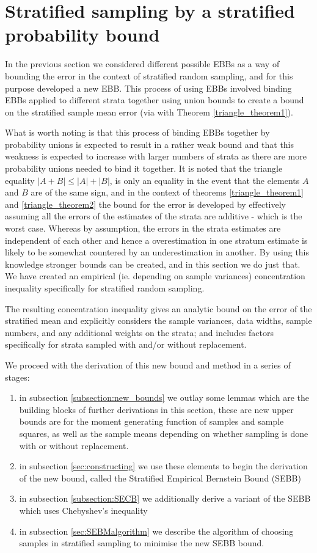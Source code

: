 

\section{Stratified sampling by a stratified probability bound}\label{section:SEBB}

In the previous section we considered different possible EBBs as a way of bounding the error in the context of stratified random sampling, and for this purpose developed a new EBB.
This process of using EBBs involved binding EBBs applied to different strata together using union bounds to create a bound on the stratified sample mean error (via with Theorem \ref{triangle_theorem1}).

What is worth noting is that this process of binding EBBs together by probability unions is expected to result in a rather weak bound and that this weakness is expected to increase with larger numbers of strata as there are more probability unions needed to bind it together.
It is noted that the triangle equality $|A+B|\le |A|+|B|$, is only an equality in the event that the elements $A$ and $B$ are of the same sign, and in the context of theorems \ref{triangle_theorem1} and \ref{triangle_theorem2} the bound for the error is developed by effectively assuming all the errors of the estimates of the strata are additive - which is the worst case.
Whereas by assumption, the errors in the strata estimates are independent of each other and hence a overestimation in one stratum estimate is likely to be somewhat countered by an underestimation in another.
By using this knowledge stronger bounds can be created, and in this section we do just that. We have created an empirical (ie. depending on sample variances) concentration inequality specifically for stratified random sampling.

The resulting concentration inequality gives an analytic bound on the error of the stratified mean and explicitly considers the sample variances, data widths, sample numbers, and any additional weights on the strata; and includes factors specifically for strata sampled with and/or without replacement.

We proceed with the derivation of this new bound and method in a series of stages:
\begin{enumerate}
\item	in subsection \ref{subsection:new_bounds} we outlay some lemmas which are the building blocks of further derivations in this section, these are new upper bounds are for the moment generating function of samples and sample squares, as well as the sample means depending on whether sampling is done with or without replacement.
\item	in subsection \ref{sec:constructing} we use these elements to begin the derivation of the new bound, called the Stratified Empirical Bernstein Bound (SEBB)
\item	in subsection \ref{subsection:SECB} we additionally derive a variant of the SEBB which uses Chebyshev's inequality
\item	in subsection \ref{sec:SEBMalgorithm} we describe the algorithm of choosing samples in stratified sampling to minimise the new SEBB bound.
\end{enumerate}

